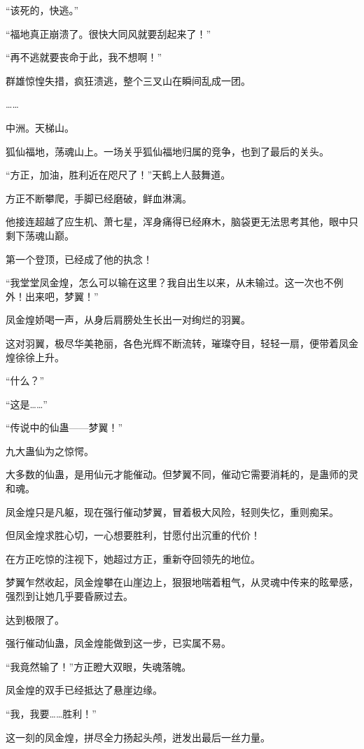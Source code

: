 \begin{this_body}
“该死的，快逃。”

“福地真正崩溃了。很快大同风就要刮起来了！”

“再不逃就要丧命于此，我不想啊！”

群雄惊惶失措，疯狂溃逃，整个三叉山在瞬间乱成一团。

……

中洲。天梯山。

狐仙福地，荡魂山上。一场关乎狐仙福地归属的竞争，也到了最后的关头。

“方正，加油，胜利近在咫尺了！”天鹤上人鼓舞道。

方正不断攀爬，手脚已经磨破，鲜血淋漓。

他接连超越了应生机、萧七星，浑身痛得已经麻木，脑袋更无法思考其他，眼中只剩下荡魂山巅。

第一个登顶，已经成了他的执念！

“我堂堂凤金煌，怎么可以输在这里？我自出生以来，从未输过。这一次也不例外！出来吧，梦翼！”

凤金煌娇喝一声，从身后肩膀处生长出一对绚烂的羽翼。

这对羽翼，极尽华美艳丽，各色光辉不断流转，璀璨夺目，轻轻一扇，便带着凤金煌徐徐上升。

“什么？”

“这是……”

“传说中的仙蛊——梦翼！”

九大蛊仙为之惊愕。

大多数的仙蛊，是用仙元才能催动。但梦翼不同，催动它需要消耗的，是蛊师的灵和魂。

凤金煌只是凡躯，现在强行催动梦翼，冒着极大风险，轻则失忆，重则痴呆。

但凤金煌求胜心切，一心想要胜利，甘愿付出沉重的代价！

在方正吃惊的注视下，她超过方正，重新夺回领先的地位。

梦翼乍然收起，凤金煌攀在山崖边上，狠狠地喘着粗气，从灵魂中传来的眩晕感，强烈到让她几乎要昏厥过去。

达到极限了。

强行催动仙蛊，凤金煌能做到这一步，已实属不易。

“我竟然输了！”方正瞪大双眼，失魂落魄。

凤金煌的双手已经抵达了悬崖边缘。

“我，我要……胜利！”

这一刻的凤金煌，拼尽全力扬起头颅，迸发出最后一丝力量。


\end{this_body}
